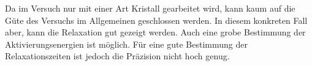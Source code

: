 Da im Versuch nur mit einer Art Kristall gearbeitet wird, kann kaum auf die Güte des Versuchs im Allgemeinen geschlossen werden. In diesem konkreten Fall aber, kann die Relaxation gut gezeigt werden. Auch eine grobe Bestimmung der Aktivierungsenergien ist möglich. Für eine gute Bestimmung der Relaxationszeiten ist jedoch die Präzision nicht hoch genug.
